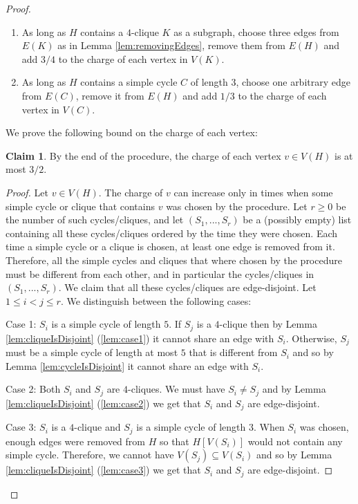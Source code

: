 \documentclass{article}
\theoremstyle{definition}
\newtheorem{claim}{Claim}[section]
\begin{document}
\begin{proof}
\begin{enumerate}
	\item \label{proc:step3} As long as $H$ contains a $4$-clique $K$ as a subgraph, choose three edges from $E(K)$ as in Lemma \ref{lem:removingEdges}, remove them from $E(H)$ and add $3/4$ to the charge of each vertex in $V(K)$.
	
	\item \label{proc:step4} As long as $H$ contains a simple cycle $C$ of length $3$, choose one arbitrary edge from $E(C)$, remove it from $E(H)$ and add $1/3$ to the charge of each vertex in $V(C)$.
\end{enumerate}

\noindent We prove the following bound on the charge of each vertex:

\begin{claim} By the end of the procedure, the charge of each vertex $v \in V(H)$ is at most $3/2$.\label{claim:chargeOfVertex}\end{claim}

\begin{proof} Let $v \in V(H)$. The charge of $v$ can increase only in times when some simple cycle or clique that contains $v$ was chosen by the procedure. Let $r \ge 0$ be the number of such cycles/cliques, and let $(S_1, ..., S_r)$ be a (possibly empty) list containing all these cycles/cliques ordered by the time they were chosen. Each time a simple cycle or a clique is chosen, at least one edge is removed from it. Therefore, all the simple cycles and cliques that where chosen by the procedure must be different from each other, and in particular the cycles/cliques in $(S_1, ..., S_r)$. We claim that all these cycles/cliques are edge-disjoint. Let $1 \le i < j \le r$. We distinguish between the following cases: \smallskip

Case 1: $S_i$ is a simple cycle of length $5$. If $S_j$ is a $4$-clique then by Lemma \ref{lem:cliqueIsDisjoint} (\ref{lem:case1}) it cannot share an edge with $S_i$. Otherwise, $S_j$ must be a simple cycle of length at most $5$ that is different from $S_i$ and so by Lemma \ref{lem:cycleIsDisjoint} it cannot share an edge with $S_i$.\smallskip

Case 2: Both $S_i$ and $S_j$ are $4$-cliques. We must have $S_i \ne S_j$ and by Lemma \ref{lem:cliqueIsDisjoint} (\ref{lem:case2}) we get that $S_i$ and $S_j$ are edge-disjoint.\smallskip

Case 3: $S_i$ is a $4$-clique and $S_j$ is a simple cycle of length $3$. When $S_i$ was chosen, enough edges were removed from $H$ so that $H[V(S_i)]$ would not contain any simple cycle. Therefore, we cannot have $V(S_j) \subseteq V(S_i)$ and so by Lemma \ref{lem:cliqueIsDisjoint} (\ref{lem:case3}) we get that $S_i$ and $S_j$ are edge-disjoint.\smallskip


\end{proof}
\end{proof}
\end{document}
